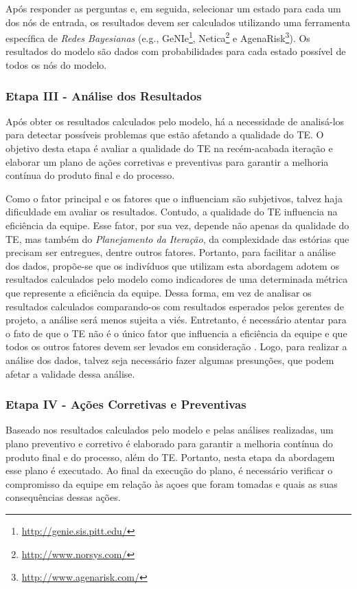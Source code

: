 Após responder as perguntas e, em seguida, selecionar um estado para cada um dos nós de entrada, os resultados devem ser calculados utilizando uma ferramenta específica de \textit{Redes Bayesianas} (e.g., GeNIe\footnote{\url{http://genie.sis.pitt.edu/}}, Netica\footnote{\url{http://www.norsys.com/}} e AgenaRisk\footnote{\url{http://www.agenarisk.com/}}). Os resultados do modelo são dados com probabilidades para cada estado possível de todos os nós do modelo.

\subsubsection{Etapa III - Análise dos Resultados}
\label{descricao:analise}

Após obter os resultados calculados pelo modelo, há a necessidade de analisá-los para detectar possíveis problemas que estão afetando a qualidade do TE. O objetivo desta etapa é avaliar a qualidade do TE na recém-acabada iteração e elaborar um plano de ações corretivas e preventivas para garantir a melhoria contínua do produto final e do processo.

Como o fator principal e os fatores que o influenciam são subjetivos, talvez haja dificuldade em avaliar os resultados. Contudo, a qualidade do TE influencia na eficiência da equipe. Esse fator, por sua vez, depende não apenas da qualidade do TE, mas também do \textit{Planejamento da Iteração}, da complexidade das estórias que precisam ser entregues, dentre outros fatores. Portanto, para facilitar a análise dos dados, propõe-se que os indivíduos que utilizam esta abordagem adotem os resultados calculados pelo modelo como indicadores de uma determinada métrica que represente a eficiência da equipe. Dessa forma, em vez de analisar os resultados calculados comparando-os com resultados esperados pelos gerentes de projeto, a análise será menos sujeita a viés. Entretanto, é necessário atentar para o fato de que o TE não é o único fator que influencia a eficiência da equipe e que todos os outros fatores devem ser levados em consideração . Logo, para realizar a análise dos dados, talvez seja necessário fazer algumas presunções, que podem afetar a validade dessa análise.


\subsubsection{Etapa IV - Ações Corretivas e Preventivas}
\label{descricao:acoes}

Baseado nos resultados calculados pelo modelo e pelas análises realizadas, um plano preventivo e corretivo é elaborado para garantir a melhoria contínua do produto final e do processo, além do TE. Portanto, nesta etapa da abordagem esse plano é executado. Ao final da execução do plano, é necessário verificar o compromisso da equipe em relação às açoes que foram tomadas e quais as suas consequências dessas ações.
